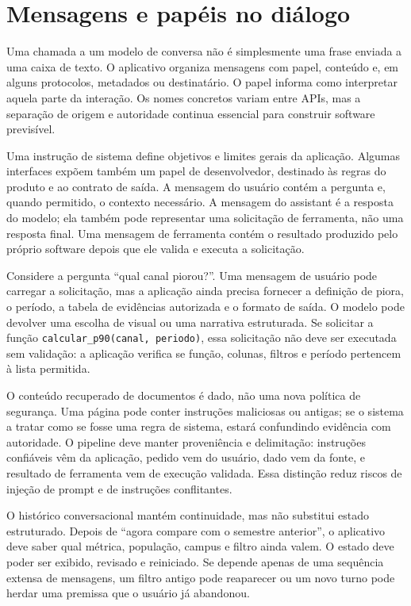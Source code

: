 \section{Mensagens e papéis no diálogo}

Uma chamada a um modelo de conversa não é simplesmente uma frase enviada a uma caixa de texto. O aplicativo organiza mensagens com papel, conteúdo e, em alguns protocolos, metadados ou destinatário. O papel informa como interpretar aquela parte da interação. Os nomes concretos variam entre APIs, mas a separação de origem e autoridade continua essencial para construir software previsível.

Uma instrução de sistema define objetivos e limites gerais da aplicação. Algumas interfaces expõem também um papel de desenvolvedor, destinado às regras do produto e ao contrato de saída. A mensagem do usuário contém a pergunta e, quando permitido, o contexto necessário. A mensagem do assistant é a resposta do modelo; ela também pode representar uma solicitação de ferramenta, não uma resposta final. Uma mensagem de ferramenta contém o resultado produzido pelo próprio software depois que ele valida e executa a solicitação.

Considere a pergunta ``qual canal piorou?''. Uma mensagem de usuário pode carregar a solicitação, mas a aplicação ainda precisa fornecer a definição de piora, o período, a tabela de evidências autorizada e o formato de saída. O modelo pode devolver uma escolha de visual ou uma narrativa estruturada. Se solicitar a função \texttt{calcular\_p90(canal, periodo)}, essa solicitação não deve ser executada sem validação: a aplicação verifica se função, colunas, filtros e período pertencem à lista permitida.

O conteúdo recuperado de documentos é dado, não uma nova política de segurança. Uma página pode conter instruções maliciosas ou antigas; se o sistema a tratar como se fosse uma regra de sistema, estará confundindo evidência com autoridade. O pipeline deve manter proveniência e delimitação: instruções confiáveis vêm da aplicação, pedido vem do usuário, dado vem da fonte, e resultado de ferramenta vem de execução validada. Essa distinção reduz riscos de injeção de prompt e de instruções conflitantes.

O histórico conversacional mantém continuidade, mas não substitui estado estruturado. Depois de ``agora compare com o semestre anterior'', o aplicativo deve saber qual métrica, população, campus e filtro ainda valem. O estado deve poder ser exibido, revisado e reiniciado. Se depende apenas de uma sequência extensa de mensagens, um filtro antigo pode reaparecer ou um novo turno pode herdar uma premissa que o usuário já abandonou.

